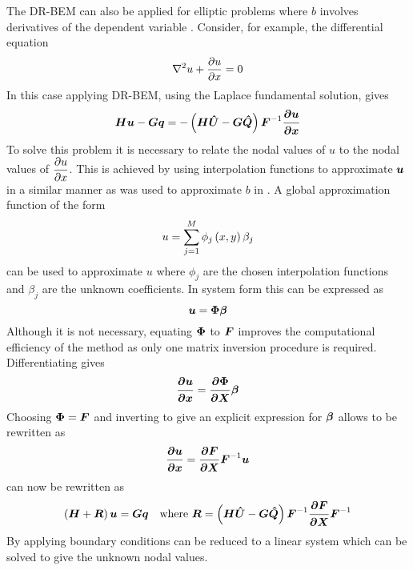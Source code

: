 The DR-BEM can also be applied for elliptic problems where
$b$ involves derivatives of the dependent variable
\cite{partridge:1992}. Consider, for example, the differential equation 
\begin{equation}
  \nabla^{2} {u} +  \dfrac{\partial u}{\partial x}  = 0
\end{equation}
In this case applying DR-BEM, using the Laplace fundamental solution, gives
\begin{equation}
  \matr{H} \vect{u} - \matr{G} \vect{q} = - \pbrac{\matr{H} \matr{\hat{U}} -
    \matr{G} \matr{\hat{Q}}} \matr{F}^{-1} \vect{\delby{u}{x}}
\end{equation}
To solve this problem it is necessary to relate the nodal values of $u$ to
the nodal values of $ \dfrac{\partial u}{\partial x} $. This is achieved by
using interpolation functions to approximate $\vect{u}$ in a similar manner
as was used to approximate $b$ in .  A global
approximation function of the form
\begin{equation}
  u =  \displaystyle\sum_{j=1}^{M}   \phi_{j}\left( x,y \right)  \beta_{j}
\end{equation}
can be used to approximate $u$ where $\phi_{j}$ are the chosen
interpolation functions and $\beta_{j}$ are the unknown coefficients.  In
system form this can be expressed as
\begin{equation}
  \vect{u} = \matr{\Phi} \vect{\beta}
  \label{eq:uapprox}
\end{equation}
Although it is not necessary, equating $\matr{\Phi}$ to $\matr{F}$ 
improves the computational efficiency of the method as only one matrix 
inversion procedure is required. Differentiating  gives 
\begin{equation}
  \vect{\delby{u}{x}} = \matr{\delby{\Phi}{x}} \vect{\beta}
  \label{eq:uappder}
\end{equation}
Choosing $\matr{\Phi} = \matr{F}$ and inverting  to give an
explicit expression for $\vect{\beta}$ allows  to be
rewritten as
\begin{equation}
  \vect{\delby{u}{x}} = \matr{\delby{F}{x}} \matr{F}^{-1} \vect{u}
  \label{eq:dudxexp}
\end{equation}
 can now be rewritten as
\begin{equation}
  \pbrac{\matr{H} + \matr{R}} \vect{u} = \matr{G}
  \vect{q}\quad\text{where }\matr{R} = \pbrac{\matr{H} \matr{\hat{U}}
    - \matr{G} \matr{\hat{Q}}} \matr{F}^{-1} \matr{\delby{F}{x}}
  \matr{F}^{-1}
\label{eq:drmderiv}
\end{equation}
By applying boundary conditions  can be reduced to 
a linear system which can be solved to give the unknown nodal values.

